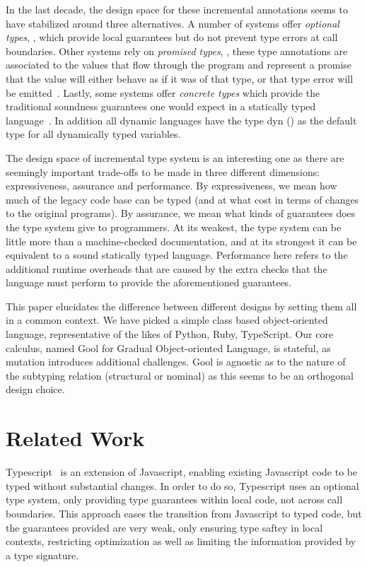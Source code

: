 \documentclass{llncs}
\begin{document}
In the last decade, the design space for these incremental annotations seems
to have stabilized around three alternatives.  A number of systems offer
\emph{optional types}, ,
\cite{PluggableTypes,Bracha93,typescript13,oopsla09} which provide local
guarantees but do not prevent type errors at call boundaries. Other systems
rely on \emph{promised types}, , these type annotations are
associated to the values that flow through the program and represent a
promise that the value will either behave as if it was of that type, or that
type error will be emitted~\cite{siek14,tf-popl08}.  Lastly, some systems
offer \emph{concrete types} which provide the traditional soundness
guarantees one would expect in a statically typed
language~\cite{thorn,stongscript,csharp}. In addition all dynamic languages
have the type dyn (\dyn) as the default type for all dynamically typed
variables.

The design space of incremental type system is an interesting one as there
are seemingly important trade-offs to be made in three different dimensions:
expressiveness, assurance and performance.  By expressiveness, we mean how
much of the legacy code base can be typed (and at what cost in terms of
changes to the original programs).  By assurance, we mean what kinds of
guarantees does the type system give to programmers. At its weakest, the
type system can be little more than a machine-checked documentation, and at
its strongest it can be equivalent to a sound statically typed language.
Performance here refers to the additional runtime overheads that are caused
by the extra checks that the language must perform to provide the
aforementioned guarantees.

\newcommand{\name}{{\sf Gool}\xspace}

This paper elucidates the difference between different designs by setting
them all in a common context. We have picked a simple class based
object-oriented language, representative of the likes of Python, Ruby,
TypeScript. Our core calculus, named \name for Gradual Object-oriented
Language, is stateful, as mutation introduces additional challenges. \name
is agnostic as to the nature of the subtyping relation (structural or
nominal) as this seems to be an orthogonal design choice.

\section{Related Work}

Typescript~\cite{typescript13} is an extension of Javascript, enabling existing 
Javascript code to be typed without substantial changes. In order to do so, 
Typescript uses an optional type system, only providing type guarantees within 
local code, not across call boundaries. This approach eases the transition from
Javascript to typed code, but the guarantees provided are very weak, only 
ensuring type saftey in local contexts, restricting optimization as well as
limiting the information provided by a type signature.
\end{document}

